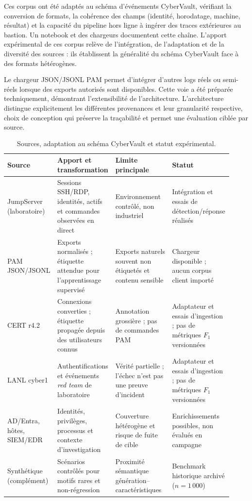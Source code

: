 \documentclass[11pt,a4paper,oneside]{report}
\theoremstyle{definition}
\theoremstyle{plain}
\begin{document}
Ces corpus ont été adaptés au schéma d'événements CyberVault, vérifiant la
conversion de formats, la cohérence des champs (identité, horodatage, machine,
résultat) et la capacité du pipeline hors ligne à ingérer des traces
extérieures au bastion. Un notebook et des chargeurs documentent cette chaîne.
L'apport expérimental de ces corpus relève de l'intégration, de l'adaptation et
de la diversité des sources : ils établissent la généralité du schéma
CyberVault face à des formats hétérogènes.

Le chargeur JSON/JSONL PAM permet d'intégrer d'autres logs réels ou semi-réels
lorsque des exports autorisés sont disponibles. Cette voie a été préparée
techniquement, démontrant l'extensibilité de l'architecture. L'architecture
distingue explicitement les différentes provenances et leur granularité
respective, choix de conception qui préserve la traçabilité et permet une
évaluation ciblée par source.

\begin{table}[tb]
  \centering
  \caption{Sources, adaptation au schéma CyberVault et statut expérimental.}
  \label{tab:eval-real-sources}
  \scriptsize
  \begin{tabular}{@{}p{0.17\linewidth}p{0.25\linewidth}p{0.25\linewidth}p{0.25\linewidth}@{}}
    \toprule
    Source & Apport et transformation & Limite principale & Statut \\
    \midrule
    JumpServer (laboratoire) &
    Sessions SSH/RDP, identités, actifs et commandes observées en direct &
    Environnement contrôlé, non industriel &
    Intégration et essais de détection/réponse réalisés \\
    PAM JSON/JSONL &
    Exports normalisés ; étiquette attendue pour l'apprentissage supervisé &
    Exports naturels souvent non étiquetés et contenu sensible &
    Chargeur disponible ; aucun corpus client importé \\
    CERT r4.2 &
    Connexions converties ; étiquette propagée depuis des utilisateurs connus &
    Annotation grossière ; pas de commandes PAM &
    Adaptateur et essais d'ingestion ; pas de métriques $F_1$ versionnées \\
    LANL cyber1 &
    Authentifications et événements \emph{red team} de laboratoire &
    Vérité partielle ; l'échec n'est pas une preuve d'incident &
    Adaptateur et essais d'ingestion ; pas de métriques $F_1$ versionnées \\
    AD/Entra, hôtes, SIEM/EDR &
    Identités, privilèges, processus et contexte d'investigation &
    Couverture hétérogène et risque de fuite de cible &
    Enrichissements possibles, non évalués en campagne \\
    Synthétique (complément) &
    Scénarios contrôlés pour motifs rares et non-régression &
    Proximité sémantique génération--caractéristiques &
    Benchmark historique archivé ($n=1\,000$) \\
    \bottomrule
  \end{tabular}
\end{table}
\end{document}
